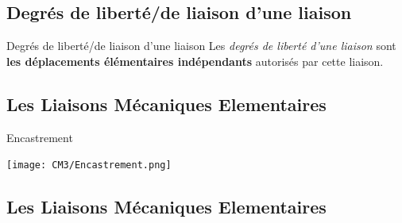 \documentclass[
  ignorenonframetext,
  aspectratio=169,
  c]{beamer}
\begin{document}
\subsection{Degrés de liberté/de liaison d'une
liaison}\label{degruxe9s-de-libertuxe9de-liaison-dune-liaison}

\begin{frame}{Degrés de liberté/de liaison d'une liaison}
Les \emph{degrés de liberté d'une liaison} sont \textbf{les déplacements
élémentaires indépendants} autorisés par cette liaison.
\end{frame}

\subsection{Les Liaisons Mécaniques
Elementaires}\label{les-liaisons-muxe9caniques-elementaires}

\begin{frame}{Encastrement}
\label{encastrement}
\begin{center}
\texttt{[image: CM3/Encastrement.png]}
\end{center}
\end{frame}

\subsection{Les Liaisons Mécaniques
Elementaires}\label{les-liaisons-muxe9caniques-elementaires-1}
\end{document}
